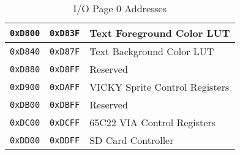 \begin{table}[ht]
\begin{center}
\begin{tabular}{|c|c|l|}
            \verb+0xD800+ & \verb+0xD83F+ & Text Foreground Color LUT \\ \hline
            \verb+0xD840+ & \verb+0xD87F+ & Text Background Color LUT \\ \hline
            \verb+0xD880+ & \verb+0xD8FF+ & Reserved \\ \hline
            \verb+0xD900+ & \verb+0xDAFF+ & VICKY Sprite Control Registers \\ \hline
            \verb+0xDB00+ & \verb+0xDBFF+ & Reserved \\ \hline
            \verb+0xDC00+ & \verb+0xDCFF+ & 65C22 VIA Control Registers \\ \hline
            \verb+0xDD00+ & \verb+0xDDFF+ & SD Card Controller \\ \hline
        \end{tabular}
        \caption{I/O Page 0 Addresses}
        \label{tab:io_page_0}
    \end{center}
\end{table}
